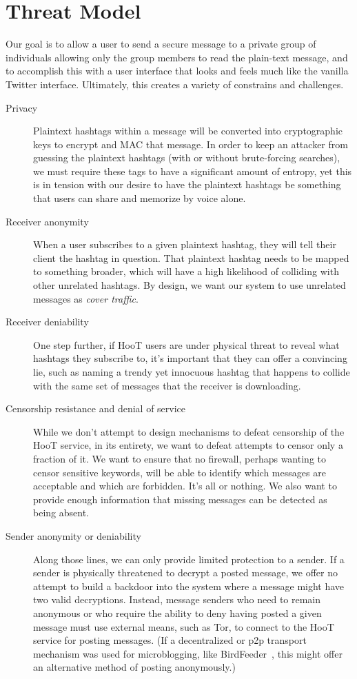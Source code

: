 \section{Threat Model}

Our goal is to allow a user to send a secure message to a private group of individuals allowing only the group members to read the plain-text message, and to accomplish this with a user interface that looks and feels much like the vanilla Twitter interface. Ultimately, this creates a variety of constrains and challenges.

\begin{description}
\item[Privacy] Plaintext hashtags within a message will be converted into cryptographic keys to encrypt and MAC that message.  In order to keep an attacker from guessing the plaintext hashtags (with or without brute-forcing searches), we must require these tags to have a significant amount of entropy, yet this is in tension with our desire to have the plaintext hashtags be something that users can share and memorize by voice alone.

\item[Receiver anonymity]  When a user subscribes to a given plaintext hashtag, they will tell their client the hashtag in question. That plaintext hashtag needs to be mapped to something broader, which will have a high likelihood of colliding with other unrelated hashtags. By design, we want our system to use unrelated messages as {\em cover traffic}.

\item[Receiver deniability] One step further, if HooT users are under physical threat to reveal what hashtags they subscribe to, it's important that they can offer a convincing lie, such as naming a trendy yet innocuous hashtag that happens to collide with the same set of messages that the receiver is downloading.

\item[Censorship resistance and denial of service] While we don't attempt to design mechanisms to defeat censorship of the HooT service, in its entirety, we want to defeat attempts to censor only a fraction of it. We want to ensure that no firewall, perhaps wanting to censor sensitive keywords, will be able to identify which messages are acceptable and which are forbidden. It's all or nothing. We also want to provide enough information that missing messages can be detected as being absent.

\item[Sender anonymity or deniability] Along those lines, we can only provide limited protection to a sender. If a sender is physically threatened to decrypt a posted message, we offer no attempt to build a backdoor into the system where a message might have two valid decryptions. Instead, message senders who need to remain anonymous or who require the ability to deny having posted a given message must use external means, such as Tor, to connect to the HooT service for posting messages. (If a decentralized or p2p transport mechanism was used for microblogging, like BirdFeeder~\cite{sandler09}, this might offer an alternative method of posting anonymously.)


\end{description}
